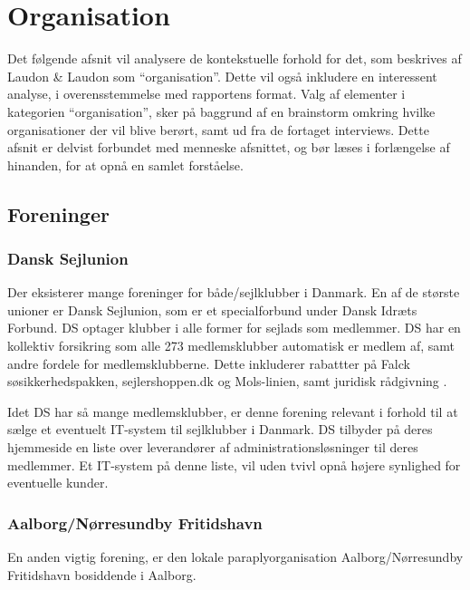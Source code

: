 \section{Organisation}

Det følgende afsnit vil analysere de kontekstuelle forhold for det, som beskrives af Laudon \& Laudon som \enquote{organisation}. Dette vil også inkludere en interessent analyse, i overensstemmelse med rapportens format. Valg af elementer i kategorien \enquote{organisation}, sker på baggrund af en brainstorm omkring hvilke organisationer der vil blive berørt, samt ud fra de fortaget interviews. Dette afsnit er delvist forbundet med menneske afsnittet, og bør læses i forlængelse af hinanden, for at opnå en samlet forståelse.

\subsection{Foreninger} %
\label{sub:Foreninger}

\subsubsection{Dansk Sejlunion} %
\label{ssub:Dansk Sejlunion}

Der eksisterer mange foreninger for både/sejlklubber i Danmark. En af de største unioner er Dansk Sejlunion, som er et specialforbund under Dansk Idræts Forbund. DS optager klubber i alle former for sejlads som medlemmer. DS har en kollektiv forsikring som alle 273 medlemsklubber automatisk er medlem af, samt andre fordele for medlemsklubberne. Dette inkluderer rabattter på Falck søsikkerhedspakken, sejlershoppen.dk og Mols-linien, samt juridisk rådgivning \cite{ds_optagelse,ds_fordele}.

Idet DS har så mange medlemsklubber, er denne forening relevant i forhold til at sælge et eventuelt IT-system til sejlklubber i Danmark. DS tilbyder på deres hjemmeside en liste over leverandører af administrationsløsninger til deres medlemmer. Et IT-system på denne liste, vil uden tvivl opnå højere synlighed for eventuelle kunder.


\subsubsection{Aalborg/Nørresundby Fritidshavn}

En anden vigtig forening, er den lokale paraplyorganisation Aalborg/Nørresundby Fritidshavn bosiddende i Aalborg.

